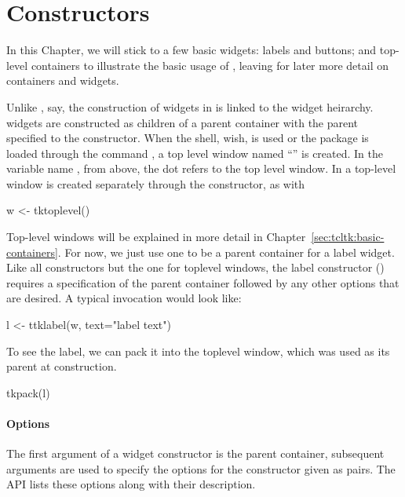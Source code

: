 
\section{Constructors}
\label{sec:tcltk:constructors}

In this Chapter, we will stick to a few basic widgets: labels and
buttons; and top-level containers to illustrate the basic usage of
, leaving for later more detail on containers and widgets.

Unlike \GTK, say, the construction of widgets in  is linked
to the widget heirarchy. \TK\/ widgets are constructed as children of
a parent container with the parent specified to the constructor. When
the \TK\/ shell, wish, is used or the \TK\/ package is loaded through
the \TCL\/ command , a top level window named
``'' is created. In the variable name , from
above, the dot refers to the top level window.  In  a
top-level window is created separately through the
 constructor, as with
\begin{Schunk}
\begin{Sinput}
 w <- tktoplevel()
\end{Sinput}
\end{Schunk}

Top-level windows will be explained in more detail in
Chapter~\ref{sec:tcltk:basic-containers}. For now, we just use one to
be a parent container for a label widget. Like all constructors but
the one for toplevel windows, the label constructor
() requires a specification of the parent
container followed by any other options that are desired. A typical
invocation would look like:
\begin{Schunk}
\begin{Sinput}
 l <- ttklabel(w, text="label text")
\end{Sinput}
\end{Schunk}

To see the label, we can pack it into the toplevel window, which was
used as its parent at construction.
\begin{Schunk}
\begin{Sinput}
 tkpack(l)
\end{Sinput}
\end{Schunk}

\paragraph{Options}
The first argument of a widget constructor is the parent container,
subsequent arguments are used to specify the options for the
constructor given as  pairs. The \TK\/ API lists these
options along with their description.

